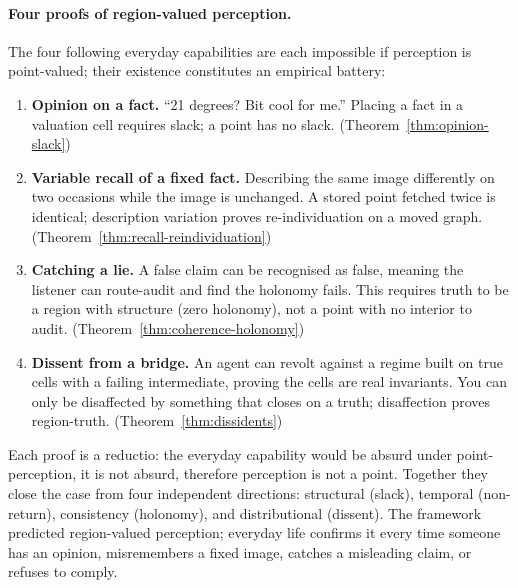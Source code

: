 \documentclass[twocolumn,11pt,a4paper]{article}
\theoremstyle{adv}
\theoremstyle{definition}
\theoremstyle{remark}
\begin{document}
\paragraph{Four proofs of region-valued perception.}
The four following everyday capabilities are each impossible if perception
is point-valued; their existence constitutes an empirical battery:
\begin{enumerate}[label=\textbf{(\arabic*)},leftmargin=2em,itemsep=2pt]
\item \textbf{Opinion on a fact.} ``21 degrees? Bit cool for me.'' Placing a
      fact in a valuation cell requires slack; a point has no slack.
      (Theorem~\ref{thm:opinion-slack})
\item \textbf{Variable recall of a fixed fact.} Describing the same image
      differently on two occasions while the image is unchanged. A stored
      point fetched twice is identical; description variation proves
      re-individuation on a moved graph.
      (Theorem~\ref{thm:recall-reindividuation})
\item \textbf{Catching a lie.} A false claim can be recognised as false,
      meaning the listener can route-audit and find the holonomy fails.
      This requires truth to be a region with structure (zero holonomy),
      not a point with no interior to audit.
      (Theorem~\ref{thm:coherence-holonomy})
\item \textbf{Dissent from a bridge.} An agent can revolt against a regime
      built on true cells with a failing intermediate, proving the cells are
      real invariants. You can only be disaffected by something that closes
      on a truth; disaffection proves region-truth.
      (Theorem~\ref{thm:dissidents})
\end{enumerate}
Each proof is a reductio: the everyday capability would be absurd under
point-perception, it is not absurd, therefore perception is not a point.
Together they close the case from four independent directions: structural
(slack), temporal (non-return), consistency (holonomy), and distributional
(dissent). The framework predicted region-valued perception; everyday life
confirms it every time someone has an opinion, misremembers a fixed image,
catches a misleading claim, or refuses to comply.
\end{document}
